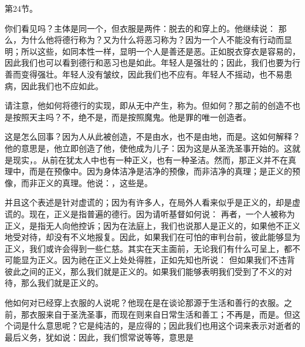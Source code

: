 第24节。 \par

你们看见吗？主体是同一个，但衣服是两件：脱去的和穿上的。他继续说： 那么，为什么他将德行称为？又为什么将恶习称为？因为一个人不能没有行动而显明；所以这些，如同本性一样，显明一个人是善还是恶。正如脱衣穿衣是容易的，因此我们也可以看到德行和恶习也是如此。年轻人是强壮的；因此，我们也要为行善而变得强壮。年轻人没有皱纹，因此我们也不应有。年轻人不摇动，也不易患病，因此我们也不应如此。\par

请注意，他如何将德行的实现，即从无中产生，称为。但如何？那之前的创造不也是按照天主吗？不，绝不是，而是按照魔鬼。他是罪的唯一创造者。\par

这是怎么回事？因为人从此被创造，不是由水，也不是由地，而是。这如何解释？他的意思是，他立即创造了他，使他成为儿子：因为这是从圣洗圣事开始的。这就是现实，。从前在犹太人中也有一种正义，也有一种圣洁。然而，那正义并不在真理中，而是在预像中。因为身体洁净是洁净的预像，而非洁净的真理；是正义的预像，而非正义的真理。他说：，这些是。\par

并且这个表述是针对虚谎的；因为有许多人，在局外人看来似乎是正义的，却是虚谎的。现在，正义是指普遍的德行。因为请听基督如何说：  再者，一个人被称为正义，是指无人向他控诉；因为在法庭上，我们也说那人是正义的，如果他不正义地受对待，却没有不义地报复。因此，如果我们在可怕的审判台前，彼此能够显为正义，我们或许会得到一些仁慈。其实在天主面前，无论我们有什么可呈上，都不可能显为正义。因为祂在正义上处处得胜，正如先知也所说： 但如果我们不违背彼此之间的正义，那么我们就是正义的。如果我们能够表明我们受到了不义的对待，那么我们就是正义的。\par

他如何对已经穿上衣服的人说呢？他现在是在谈论那源于生活和善行的衣服。之前，那衣服来自于圣洗圣事，而现在则来自日常生活和善工；不再是，而是。但这个词是什么意思呢？它是纯洁的，是应得的；因此我们也用这个词来表示对逝者的最后义务，犹如说：因此，我们惯常说等等，意思是\par

